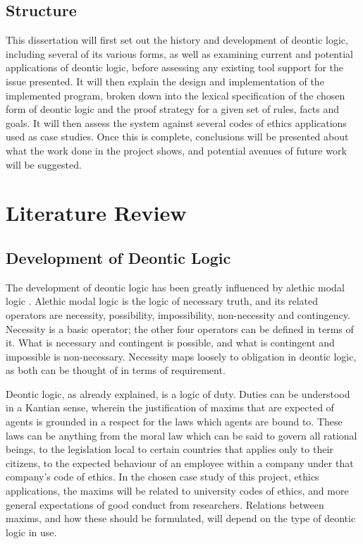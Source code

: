 \documentclass{l4proj}
\begin{document}
\section{Structure}
This dissertation will first set out the history and development of deontic logic, including several of its various forms, as well as examining current and potential applications of deontic logic, before assessing any existing tool support for the issue presented. It will then explain the design and implementation of the implemented program, broken down into the lexical specification of the chosen form of deontic logic and the proof strategy for a given set of rules, facts and goals. It will then assess the system against several codes of ethics applications used as case studies. Once this is complete, conclusions will be presented about what the work done in the project shows, and potential avenues of future work will be suggested. 

\chapter{Literature Review}

\section{Development of Deontic Logic}%
The development of deontic logic has been greatly influenced by alethic modal logic \cite{sep-logic-deontic}. Alethic modal logic is the logic of necessary truth, and its related operators are necessity, possibility, impossibility, non-necessity and contingency. Necessity is a basic operator; the other four operators can be defined in terms of it. What is necessary and contingent is possible, and what is contingent and impossible is non-necessary. Necessity maps loosely to obligation in deontic logic, as both can be thought of in terms of requirement. 

Deontic logic, as already explained, is a logic of duty. Duties can be understood in a Kantian sense, wherein the justification of maxims that are expected of agents is grounded in a respect for the laws which agents are bound to\cite{sep-kant-moral}. These laws can be anything from the moral law which can be said to govern all rational beings, to the legislation local to certain countries that applies only to their citizens, to the expected behaviour of an employee within a company under that company's code of ethics. In the chosen case study of this project, ethics applications, the maxims will be related to university codes of ethics, and more general expectations of good conduct from researchers. Relations between maxims, and how these should be formulated, will depend on the type of deontic logic in use. 
\end{document}
